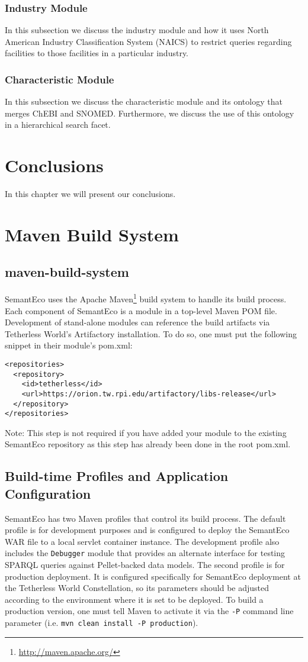 \documentclass[letterpaper]{report}
\begin{document}
\subsection{Industry Module}
In this subsection we discuss the industry module and how it uses North American Industry Classification System (NAICS) to restrict queries regarding facilities to those facilities in a particular industry.
\subsection{Characteristic Module}
In this subsection we discuss the characteristic module and its ontology that merges ChEBI and SNOMED. Furthermore, we discuss the use of this ontology in a hierarchical search facet.
\chapter{Conclusions}
In this chapter we will present our conclusions.

\appendix
\chapter{Maven Build System}
\section{maven-build-system}
SemantEco uses the Apache Maven\footnote{\url{http://maven.apache.org/}} build system to handle its build process. Each component of SemantEco is a module in a top-level Maven POM file. Development of stand-alone modules can reference the build artifacts via Tetherless World's Artifactory installation. To do so, one must put the following snippet in their module's pom.xml:

\begin{lstlisting}
<repositories>
  <repository>
    <id>tetherless</id>
    <url>https://orion.tw.rpi.edu/artifactory/libs-release</url>
  </repository>
</repositories>
\end{lstlisting}

\noindent Note: This step is not required if you have added your module to the existing SemantEco repository as this step has already been done in the root pom.xml.

\section{Build-time Profiles and Application Configuration}
SemantEco has two Maven profiles that control its build process. The default profile is for development purposes and is configured to deploy the SemantEco WAR file to a local servlet container instance. The development profile also includes the \texttt{Debugger} module that provides an alternate interface for testing SPARQL queries against Pellet-backed data models. The second profile is for production deployment. It is configured specifically for SemantEco deployment at the Tetherless World Constellation, so its parameters should be adjusted according to the environment where it is set to be deployed. To build a production version, one must tell Maven to activate it via the \texttt{-P} command line parameter (i.e. \texttt{mvn clean install -P production}).
\end{document}
